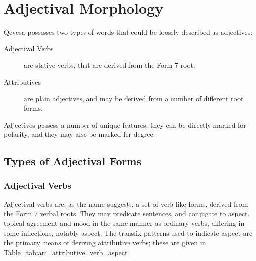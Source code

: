\documentclass[grammar]{subfiles}
\begin{document}
  \chapter{Adjectival Morphology}
  \label{ch:adjectival-morphology}

  Qevesa possesses two types of words that could be loosely described as adjectives:

  \begin{description}
    \item[Adjectival Verbs] are stative verbs, that are derived from the Form 7 root.
    \item[Attributives] are plain adjectives, and may be derived from a number of different root forms.
  \end{description}

  Adjectives possess a number of unique features: they can be directly marked for polarity, and they may also be marked for degree.

  \section{Types of Adjectival Forms}
  \label{sec:am_adjectival_forms}

  \subsection{Adjectival Verbs}
  \label{ssec:am_adjectival_verbs}

  Adjectival verbs are, as the name suggests, a set of verb-like forms, derived from the Form 7 verbal roots. 
  They may predicate sentences, and conjugate to aspect, topical agreement and mood in the same manner as ordinary verbs, differing in some inflections, notably aspect. %
  The transfix patterns used to indicate aspect are the primary means of deriving attributive verbs; these are given in Table~\ref{tab:am_attributive_verb_aspect}.
\end{document}
